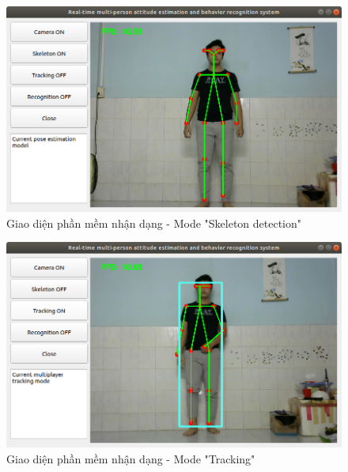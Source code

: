 \FloatBarrier
\begin{figure}[htp]
\begin{center}
\includegraphics[scale=0.5]{chap6/c6_figs/mode_skeleton.png}
\end{center}
\caption{Giao diện phần mềm nhận dạng - Mode "Skeleton detection"}
\label{fig:gui1}
\end{figure}
\FloatBarrier

\FloatBarrier
\begin{figure}[htp]
\begin{center}
\includegraphics[scale=0.5]{chap6/c6_figs/mode_tracking.png}
\end{center}
\caption{Giao diện phần mềm nhận dạng - Mode "Tracking"}
\label{fig:gui2}
\end{figure}
\FloatBarrier

